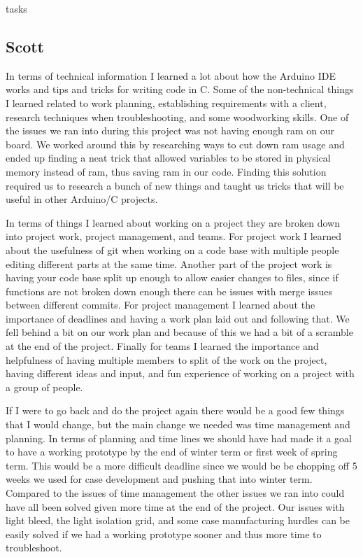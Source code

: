 tasks\documentclass[onecolumn, draftclsnofoot,10pt, compsoc]{IEEEtran}
\begin{document}
\subsection{Scott}
In terms of technical information I learned a lot about how the Arduino IDE works and tips and tricks for writing code in C.
Some of the non-technical things I learned related to work planning, establishing requirements with a client, research techniques when troubleshooting, and some woodworking skills.
One of the issues we ran into during this project was not having enough ram on our board.
We worked around this by researching ways to cut down ram usage and ended up finding a neat trick that allowed variables to be stored in physical memory instead of ram, thus saving ram in our code.
Finding this solution required us to research a bunch of new things and taught us tricks that will be useful in other Arduino/C projects.

In terms of things I learned about working on a project they are broken down into project work, project management, and teams.
For project work I learned about the usefulness of git when working on a code base with multiple people editing different parts at the same time.
Another part of the project work is having your code base split up enough to allow easier changes to files, since if functions are not broken down enough there can be issues with merge issues between different commits.
For project management I learned about the importance of deadlines and having a work plan laid out and following that.
We fell behind a bit on our work plan and because of this we had a bit of a scramble at the end of the project.
Finally for teams I learned the importance and helpfulness of having multiple members to split of the work on the project, having different ideas and input, and fun experience of working on a project with a group of people.

If I were to go back and do the project again there would be a good few things that I would change, but the main change we needed was time management and planning.
In terms of planning and time lines we should have had made it a goal to have a working prototype by the end of winter term or first week of spring term.
This would be a more difficult deadline since we would be be chopping off 5 weeks we used for case development and pushing that into winter term.
Compared to the issues of time management the other issues we ran into could have all been solved given more time at the end of the project.
Our issues with light bleed, the light isolation grid, and some case manufacturing hurdles can be easily solved if we had a working prototype sooner and thus more time to troubleshoot.

\newpage


\end{document}
